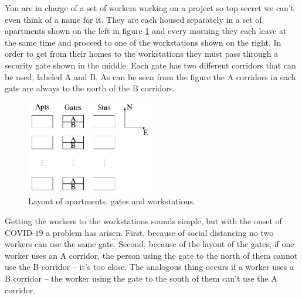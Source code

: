 
You are in charge of a set of workers working on a project so top secret we can't even think of a name for it.  They are each housed separately in a set of apartments shown on the left in figure \ref{fig:layout} and every morning they each leave at the same time and proceed to one of the workstations shown on the right.  In order to get from their homes to the workstations they must pass through a security gate shown in the middle.  Each gate has two different corridors that can be used, labeled A and B.  As can be seen from the figure the A corridors in each gate are always to the north of the B corridors.

\setlength{\unitlength}{3pt}
\begin{figure}[!h]
\centering
\includegraphics[width=0.5\textwidth]{workers_fig.png}
\caption{Layout of apartments, gates and workstations.}
\label{fig:layout}
\end{figure}

Getting the workers to the workstations sounds simple, but with the onset of COVID-$19$ a problem has arisen.  First, because of social distancing no two workers can use the same gate.  Second, because of the layout of the gates, if one worker uses an A corridor, the person using the gate to the north of them cannot use the B corridor -- it's too close.  The analogous thing occurs if a worker uses a B corridor -- the worker using the gate to the south of them can't use the A corridor.

